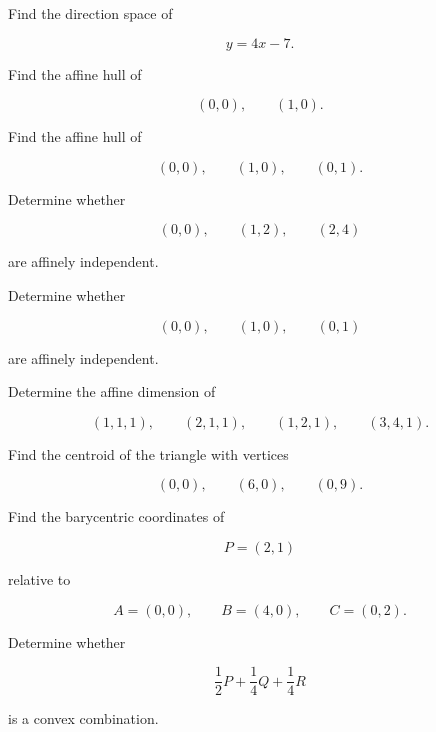 \begin{exercise}[2]
Find the direction space of

\[ y=4x-7. \]
\end{exercise}

\begin{exercise}[2]
Find the affine hull of

\[ (0,0),\qquad(1,0). \]
\end{exercise}

\begin{exercise}[2]
Find the affine hull of

\[ (0,0),\qquad(1,0),\qquad(0,1). \]
\end{exercise}

\begin{exercise}[2]
Determine whether

\[
(0,0),\qquad
(1,2),\qquad
(2,4)
\]

are affinely independent.
\end{exercise}

\begin{exercise}[2]
Determine whether

\[
(0,0),\qquad
(1,0),\qquad
(0,1)
\]

are affinely independent.
\end{exercise}

\begin{exercise}[3]
Determine the affine dimension of

\[
(1,1,1),\qquad
(2,1,1),\qquad
(1,2,1),\qquad
(3,4,1).
\]
\end{exercise}

\begin{exercise}[2]
Find the centroid of the triangle with vertices

\[ (0,0),\qquad(6,0),\qquad(0,9). \]
\end{exercise}

\begin{exercise}[3]
Find the barycentric coordinates of

\[ P=(2,1) \]

relative to

\[
A=(0,0),\qquad
B=(4,0),\qquad
C=(0,2).
\]
\end{exercise}

\begin{exercise}[2]
Determine whether

\[
\frac12P+\frac14Q+\frac14R
\]

is a convex combination.
\end{exercise}

